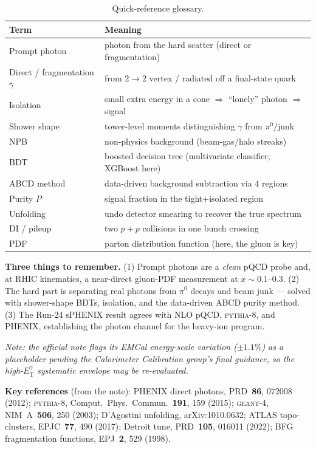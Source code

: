 \documentclass[11pt]{article}
\newlength{\calloutwd}
\newenvironment{nutshell}{%
  \par\vspace{6pt}\noindent
  \setlength{\fboxsep}{8pt}%
  \begingroup\color{black}%
  \fcolorbox{bggreenline}{boxgreen}\bgroup
  \begin{minipage}{\calloutwd}}
  {\end{minipage}\egroup\endgroup\par\vspace{6pt}}
\newcommand{\ETg}{E_{\mathrm{T}}^{\gamma}}
\newcommand{\pp}{p{+}p}
\begin{document}
\begin{table}[h]
\centering
\caption{Quick-reference glossary.}
\begin{tabular}{ll}
\toprule
Term & Meaning \\
\midrule
Prompt photon & photon from the hard scatter (direct or fragmentation) \\
Direct / fragmentation $\gamma$ & from $2\to2$ vertex / radiated off a final-state quark \\
Isolation & small extra energy in a cone $\Rightarrow$ ``lonely'' photon $\Rightarrow$ signal \\
Shower shape & tower-level moments distinguishing $\gamma$ from $\pi^0/$junk \\
NPB & non-physics background (beam-gas/halo streaks) \\
BDT & boosted decision tree (multivariate classifier; XGBoost here) \\
ABCD method & data-driven background subtraction via 4 regions \\
Purity $P$ & signal fraction in the tight+isolated region \\
Unfolding & undo detector smearing to recover the true spectrum \\
DI / pileup & two $\pp$ collisions in one bunch crossing \\
PDF & parton distribution function (here, the gluon is key) \\
\bottomrule
\end{tabular}
\end{table}

\begin{nutshell}
\textbf{Three things to remember.}
(1) Prompt photons are a \emph{clean} pQCD probe and, at RHIC kinematics, a near-direct gluon-PDF
measurement at $x\sim0.1$--$0.3$.
(2) The hard part is separating real photons from $\pi^0$ decays and beam junk --- solved with
shower-shape BDTs, isolation, and the data-driven ABCD purity method.
(3) The Run-24 sPHENIX result agrees with NLO pQCD, \textsc{pythia}-8, and PHENIX, establishing
the photon channel for the heavy-ion program.
\end{nutshell}

\vspace{8pt}
\noindent\textit{Note: the official note flags its EMCal energy-scale variation ($\pm1.1\%$) as a
placeholder pending the Calorimeter Calibration group's final guidance, so the high-$\ETg$
systematic envelope may be re-evaluated.}

\vspace{12pt}
\noindent\textbf{Key references} (from the note): PHENIX direct photons, PRD~\textbf{86}, 072008
(2012); \textsc{pythia}-8, Comput.~Phys.~Commun.~\textbf{191}, 159 (2015); \textsc{geant}-4,
NIM~A~\textbf{506}, 250 (2003); D'Agostini unfolding, arXiv:1010.0632; ATLAS topo-clusters,
EPJC~\textbf{77}, 490 (2017); Detroit tune, PRD~\textbf{105}, 016011 (2022); BFG fragmentation
functions, EPJ~\textbf{2}, 529 (1998).
\end{document}

